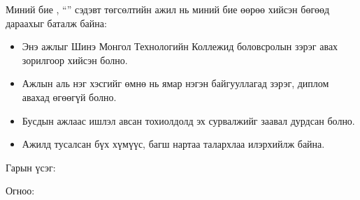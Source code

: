 \begin{declaration}
\addchaptertocentry{\authorshipname}
\scshape\Large \textbf{\authorshipname}\vspace{1.2cm}
\normalfont\normalsize

\noindent Миний бие \shortname, “\ttitle” сэдэвт төгсөлтийн ажил нь миний бие өөрөө хийсэн бөгөөд дараахыг баталж байна:

\begin{itemize}
    \item Энэ ажлыг Шинэ Монгол Технологийн Коллежид боловсролын зэрэг авах зорилгоор хийсэн болно.
    \item Ажлын аль нэг хэсгийг өмнө нь ямар нэгэн байгууллагад зэрэг, диплом авахад өгөөгүй болно.
    \item Бусдын ажлаас ишлэл авсан тохиолдолд эх сурвалжийг заавал дурдсан болно.
    \item Ажилд тусалсан бүх хүмүүс, багш нартаа талархлаа илэрхийлж байна.
\end{itemize}

\vspace{2cm}

\noindent Гарын үсэг: \hspace{8cm}

\vspace{1cm}
\noindent Огноо: \makebox[8cm]{\hrulefill}

\end{declaration}